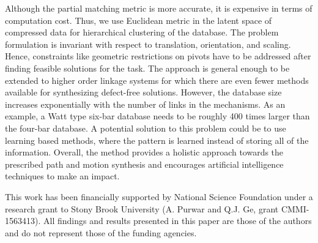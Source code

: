 \documentclass[twocolumn,10pt]{asme2ej}
\begin{document}
Although the partial matching metric is more accurate, it is expensive in terms of computation cost.
Thus, we use Euclidean metric in the latent space of compressed data for hierarchical clustering of the database.
The problem formulation is invariant with respect to translation, orientation, and scaling.
Hence, constraints like geometric restrictions on pivots have to be addressed after finding feasible solutions for the task.
The approach is general enough to be extended to higher order linkage systems for which there are even fewer methods available for synthesizing defect-free solutions.
However, the database size increases exponentially with the number of links in the mechanisms.
As an example, a Watt type six-bar database needs to be roughly 400 times larger than the four-bar database.
A potential solution to this problem could be to use learning based methods, where the pattern is learned instead of storing all of the information.
Overall, the method provides a holistic approach towards the prescribed path and motion synthesis and encourages artificial intelligence techniques to make an impact.


\begin{acknowledgment}
This work has been financially supported by National Science Foundation under a research grant to Stony Brook University (A. Purwar and Q.J. Ge, grant CMMI-1563413). All findings and results presented in this paper are those of the authors and do not represent those of the funding agencies.
\end{acknowledgment}



\newpage
\clearpage
\listoftables
\listoffigures
\end{document}
